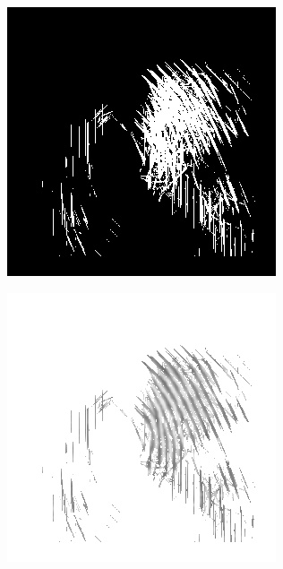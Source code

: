 \documentclass{beamer}
\begin{document}
{\begin{figure}[!ht]
\begin{subfigure}[ht]{0.15\textwidth}
        \end{subfigure}
        \qquad
        \begin{subfigure}[ht]{0.15\textwidth}
            \includegraphics[width=\textwidth]{fingerprints/2000Db1a/2_3_mask.jpg}
        \end{subfigure}
        \qquad
        \begin{subfigure}[ht]{0.15\textwidth}
            \includegraphics[width=\textwidth]{fingerprints/2000Db1a/2_3_filtered.jpg}
        \end{subfigure}
    \end{figure}
}
\end{document}
